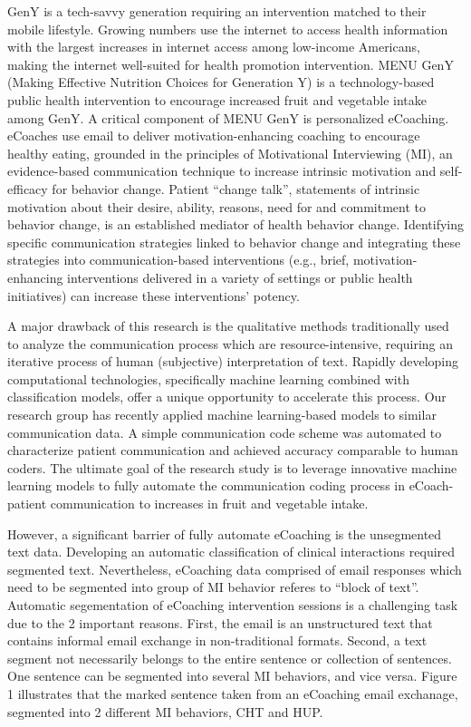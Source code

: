 \documentclass{amia}
\begin{document}
GenY is a tech-savvy generation requiring an intervention matched to their mobile lifestyle. Growing numbers use the internet to access health information with the largest increases in internet access among low-income Americans, making the internet well-suited for health promotion intervention\cite{strecher2007internet}. MENU GenY\cite{alexander2017motivations} (Making Effective Nutrition Choices for Generation Y) is a technology-based public health intervention to encourage increased fruit and vegetable intake among GenY. A critical component of MENU GenY is personalized eCoaching. eCoaches use email to deliver motivation-enhancing coaching to encourage healthy eating, grounded in the principles of Motivational Interviewing (MI), an evidence-based communication technique to increase intrinsic motivation and self-efficacy for behavior change\cite{miller2012motivational,miller2009ten,miller2009toward}. Patient ``change talk'', statements of intrinsic motivation about their desire, ability, reasons, need for and commitment to behavior change, is an established mediator of health behavior change\cite{apodaca2009mechanisms}. Identifying specific communication strategies linked to behavior change and integrating these strategies into communication-based interventions (e.g., brief, motivation-enhancing interventions delivered in a variety of settings or public health initiatives) can increase these interventions' potency.

A major drawback of this research is the qualitative methods traditionally used to analyze the communication process which are resource-intensive, requiring an iterative process of human (subjective) interpretation of text. Rapidly developing computational technologies, specifically machine learning combined with classification models, offer a unique opportunity to accelerate this process. Our research group has recently applied machine learning-based models to similar communication data\cite{hasan2016study,kotov2015interpretable}. A simple communication code scheme was automated to characterize patient communication and achieved accuracy comparable to human coders\cite{hasan2016study}. The ultimate goal of the research study is to leverage innovative machine learning models to fully automate the communication coding process in eCoach-patient communication to increases in fruit and vegetable intake. 

However, a significant barrier of fully automate eCoaching is the unsegmented text data. Developing an automatic classification of clinical interactions required segmented text. Nevertheless, eCoaching data comprised of email responses which need to be segmented into group of MI behavior referes to ``block of text''. Automatic segementation of eCoaching intervention sessions is a challenging task due to the 2 important reasons. First, the email is an unstructured text that contains informal email exchange in non-traditional formats. Second, a text segment not necessarily belongs to the entire sentence or collection of sentences. One sentence can be segmented into several MI behaviors, and vice versa. Figure 1 illustrates that the marked sentence taken from an eCoaching email exchanage, segmented into 2 different MI behaviors, CHT and HUP. 
\end{document}
